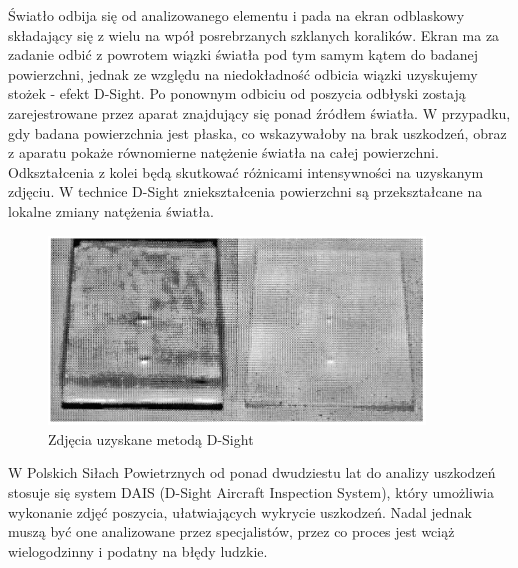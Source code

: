 \documentclass[polish,12pt]{aghthesis}
\begin{document}
\newline
Światło odbija się od analizowanego elementu i pada na ekran odblaskowy składający się z wielu na wpół posrebrzanych szklanych koralików. Ekran ma za zadanie odbić z powrotem wiązki światła pod tym samym kątem do badanej powierzchni, jednak ze względu na niedokładność odbicia wiązki uzyskujemy stożek - efekt D-Sight. Po ponownym odbiciu od poszycia odbłyski zostają zarejestrowane przez aparat znajdujący się ponad źródłem światła. W przypadku, gdy badana powierzchnia jest płaska, co wskazywałoby na brak uszkodzeń, obraz z aparatu pokaże równomierne natężenie światła na całej powierzchni. Odkształcenia z kolei będą skutkować różnicami intensywności na uzyskanym zdjęciu. W technice D-Sight zniekształcenia powierzchni są przekształcane na lokalne zmiany natężenia światła\cite{artRey}.
\begin{figure} [h]
  \centering
  \includegraphics[width=10cm]{images/d-sight-example.PNG}
  \caption{Zdjęcia uzyskane metodą D-Sight\cite{confpaperHeida}}
  \label{fig:d-sight-ex}
\end{figure}
\par
W Polskich Siłach Powietrznych od ponad dwudziestu lat do analizy uszkodzeń stosuje się system DAIS (D-Sight Aircraft Inspection System), który umożliwia wykonanie zdjęć poszycia, ułatwiających wykrycie uszkodzeń. Nadal jednak muszą być one analizowane przez specjalistów, przez co proces jest wciąż wielogodzinny i podatny na błędy ludzkie.
\end{document}
